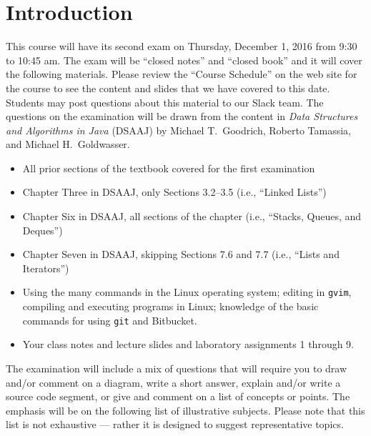 


\vspace*{-.35in}
\section*{Introduction}

This course will have its second exam on Thursday, December 1, 2016 from 9:30 to 10:45 am. The exam will be ``closed
notes'' and ``closed book'' and it will cover the following materials. Please review the ``Course Schedule'' on the web
site for the course to see the content and slides that we have covered to this date. Students may post questions about
this material to our Slack team. The questions on the examination will be drawn from the content in {\em Data Structures
and Algorithms in Java\/} (DSAAJ) by Michael T.\ Goodrich, Roberto Tamassia, and Michael H.\ Goldwasser.

\begin{itemize}

  \itemsep 0in

  \item All prior sections of the textbook covered for the first examination

  \item Chapter Three in DSAAJ, only Sections 3.2--3.5  (i.e., ``Linked Lists'')

  \item Chapter Six in DSAAJ, all sections of the chapter (i.e., ``Stacks, Queues, and Deques'')

  \item Chapter Seven in DSAAJ, skipping Sections 7.6 and 7.7 (i.e., ``Lists and Iterators'')

  \item Using the many commands in the Linux operating system; editing in {\tt gvim}, compiling and executing
    programs in Linux; knowledge of the basic commands for using {\tt git} and Bitbucket.

  \item Your class notes and lecture slides and laboratory assignments 1 through 9.

\end{itemize}

\noindent The examination will include a mix of questions that will require you to draw and/or comment on a diagram,
write a short answer, explain and/or write a source code segment, or give and comment on a list of concepts or points.
The emphasis will be on the following list of illustrative subjects. Please note that this list is not exhaustive ---
rather it is designed to suggest representative topics.


